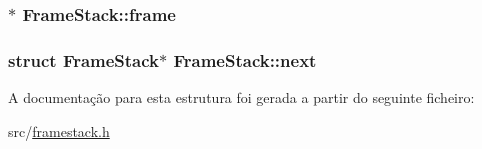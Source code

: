 \subsubsection[{\texorpdfstring{frame}{frame}}]{$\ast$ Frame\+Stack\+::frame}\hypertarget{structFrameStack_a6175986505277602d1e3cdc9fbbfb8b4}{}\label{structFrameStack_a6175986505277602d1e3cdc9fbbfb8b4}
\subsubsection[{\texorpdfstring{next}{next}}]{\setlength{\rightskip}{0pt plus 5cm}struct {\bf Frame\+Stack}$\ast$ Frame\+Stack\+::next}\hypertarget{structFrameStack_a7b333d40fd3fda54503169413dec8ddd}{}\label{structFrameStack_a7b333d40fd3fda54503169413dec8ddd}


A documentação para esta estrutura foi gerada a partir do seguinte ficheiro\+:\begin{DoxyCompactItemize}
\item 
src/\hyperlink{framestack_8h}{framestack.\+h}\end{DoxyCompactItemize}
